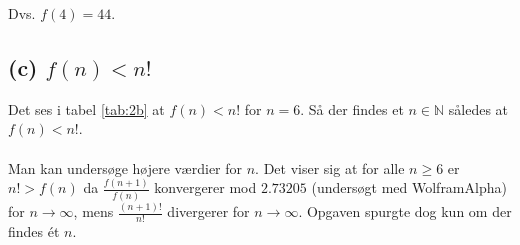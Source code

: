 Dvs. $f(4)=44$.

\subsection*{(c) $f(n) < n!$}
Det ses i tabel \ref{tab:2b} at $f(n) < n!$ for $n=6$. Så der findes et $n \in \mathbb{N}$ således at $f(n) < n!$.\\
\\
Man kan undersøge højere værdier for $n$. Det viser sig at for alle $n \geq 6$ er $n! > f(n)$ da $\frac{f(n+1)}{f(n)}$ konvergerer mod $2.73205$ (undersøgt med WolframAlpha) for $n \rightarrow \infty$, mens $\frac{(n+1)!}{n!}$ divergerer for $n \rightarrow \infty$. Opgaven spurgte dog kun om der findes ét $n$.
